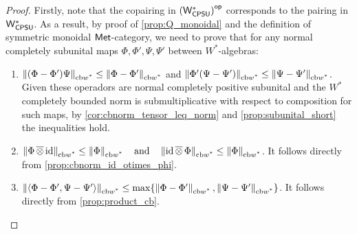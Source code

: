 \begin{proof}

  Firstly, note that the copairing in $\left(\mathsf{W^*_{CPSU}}\right)^{\mathsf{op}}$ corresponds to the pairing in $\mathsf{W^*_{CPSU}}$. As a result, by proof of \autoref{prop:Q_monoidal} and the definition of  symmetric monoidal $\mathsf{Met}$-category, we need to prove that for any normal completely subunital maps $\Phi,\Phi',\Psi,\Psi' $ between $W^*$-algebras:
  \begin{enumerate}
    \item $\left\lVert (\Phi - \Phi')\Psi \right\rVert_{\text{cb$w^*$}} \leq \left\lVert \Phi - \Phi' \right\rVert_{\text{cb$w^*$}}  $ and  $\left\lVert \Phi'(\Psi - \Psi') \right\rVert_{\text{cb$w^*$}} \leq \left\lVert \Psi - \Psi' \right\rVert_{\text{cb$w^*$}}$. 
     Given these operadors are normal completely positive subunital and the $W^*$ completely bounded norm is submultiplicative with respect to composition for such maps, by \autoref{cor:cbnorm_tensor_leq_norm} and \autoref{prop:subunital_short} the inequalities hold.
     \item $\left\lVert \Phi \,\overline{\otimes} \, \mathrm{id} \right\rVert_{\text{cb$w^*$}} \leq \left\lVert \Phi \right\rVert_{\text{cb$w^*$}} \quad \text{and} \quad  \left\lVert \mathrm{id}\,\overline{\otimes} \, \Phi \right\rVert_{\text{cb$w^*$}} \leq \left\lVert \Phi \right\rVert_{\text{cb$w^*$}}$. It follows directly from \autoref{prop:cbnorm_id_otimes_phi}.
     \item $\left\lVert \langle \Phi - \Phi' , \Psi- \Psi' \rangle \right\rVert_{\text{cb$w^*$}} \leq \max \{\left\lVert  \Phi - \Phi' \right\rVert_{\text{cb$w^*$}}, \left\lVert \Psi- \Psi' \right\rVert_{\text{cb$w^*$}}\}$. It follows directly from \autoref{prop:product_cb}.
  \end{enumerate}

\end{proof}

